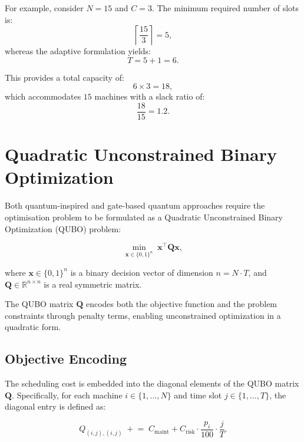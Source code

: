 For example, consider $N = 15$ and $C = 3$. The minimum required number of slots is:
\begin{equation}
\left\lceil \frac{15}{3} \right\rceil = 5,
\end{equation}
whereas the adaptive formulation yields:
\begin{equation}
T = 5 + 1 = 6.
\end{equation}

This provides a total capacity of:
\begin{equation}
6 \times 3 = 18,
\end{equation}
which accommodates $15$ machines with a slack ratio of:
\begin{equation}
\frac{18}{15} = 1.2.
\end{equation}

\section{Quadratic Unconstrained Binary Optimization}
Both quantum-inspired and gate-based quantum approaches require the optimisation problem to be formulated as a Quadratic Unconstrained Binary Optimization (QUBO) problem:

\begin{equation}
\min_{\mathbf{x} \in \{0,1\}^n} \; \mathbf{x}^\top \mathbf{Q} \mathbf{x},
\end{equation}

where $\mathbf{x} \in \{0,1\}^n$ is a binary decision vector of dimension $n = N \cdot T$, and $\mathbf{Q} \in \mathbb{R}^{n \times n}$ is a real symmetric matrix.

The QUBO matrix $\mathbf{Q}$ encodes both the objective function and the problem constraints through penalty terms, enabling unconstrained optimization in a quadratic form.

\subsection{Objective Encoding}
The scheduling cost is embedded into the diagonal elements of the QUBO matrix $\mathbf{Q}$. Specifically, for each machine $i \in \{1, \ldots, N\}$ and time slot $j \in \{1, \ldots, T\}$, the diagonal entry is defined as:

\begin{equation}
Q_{(i,j),(i,j)} \; \mathrel{+}= \;
C_{\text{maint}} 
+ C_{\text{risk}} \cdot \frac{p_i}{100} \cdot \frac{j}{T}.
\end{equation}

